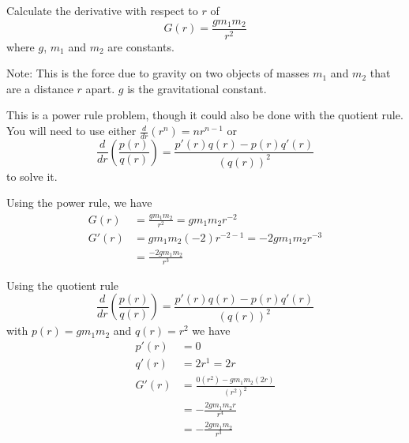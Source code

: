 \documentclass{ximera}
\author{Emma Smith Zbarsky}
\begin{document}
\begin{exercise}

Calculate the derivative with respect to $r$ of
\[G(r) = \frac{g m_1m_2}{r^2}\] where $g$, $m_1$ and $m_2$ are
constants.

Note: This is the force due to gravity on two objects of masses $m_1$
and $m_2$ that are a distance $r$ apart. $g$ is the gravitational
constant.


\begin{hint}
This is a power rule problem, though it could also be done with the
quotient rule. You will need to use either
$\frac{d}{dr}\left(r^n\right) = nr^{n-1}$ or
\[\frac{d}{dr}\left(\frac{p(r)}{q(r)}\right) = \frac{p'(r)q(r)-p(r)q'(r)}{\left(q(r)\right)^2}\]
to solve it.
\end{hint}


\begin{hint}
Using the power rule, we have \begin{align*}
G(r) &= \frac{gm_1m_2}{r^2} = gm_1m_2r^{-2} \\
G'(r) &= gm_1m_2(-2)r^{-2-1} = -2gm_1m_2r^{-3} \\
&= \boxed{\frac{-2gm_1m_2}{r^3}}\end{align*}

Using the quotient rule
\[\frac{d}{dr}\left(\frac{p(r)}{q(r)}\right) = \frac{p'(r)q(r)-p(r)q'(r)}{\left(q(r)\right)^2}\]
with $p(r) = gm_1m_2$ and $q(r) = r^2$ we have \begin{align*}
p'(r) &= 0 \\
q'(r) &= 2r^1 = 2r\\
G'(r) &= \frac{0(r^2)-gm_1m_2(2r)}{(r^2)^2} \\
&= -\frac{2gm_1m_2r}{r^4} \\
&= \boxed{-\frac{2gm_1m_2}{r^3}}
\end{align*}
\end{hint}


\begin{multipleChoice}
\end{multipleChoice}

\end{exercise}
\end{document}
